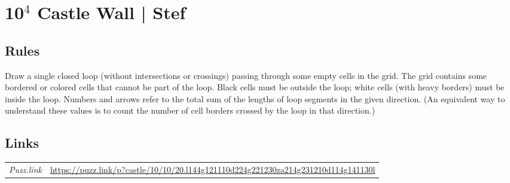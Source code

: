 \section{10$^4$ Castle Wall | {\normalfont Stef}}
\label{sec:37-104-castle-wall-stef}

\subsection*{Rules}
\begin{markdown}
Draw a single closed loop (without intersections or crossings) passing through some empty cells in the grid. The grid contains some bordered or colored cells that cannot be part of the loop. Black cells must be outside the loop; white cells (with heavy borders) must be inside the loop. Numbers and arrows refer to the total sum of the lengths of loop segments in the given direction. (An equivalent way to understand these values is to count the number of cell borders crossed by the loop in that direction.)
\end{markdown}
\subsection*{Links}
\begin{tabularx}{\textwidth}{l X}
\emph{Puzz.link} & \url{https://puzz.link/p?castle/10/10/20.l144g121110d224g221230za214g231210d114g141130l} \\
\end{tabularx}
\pagebreak

